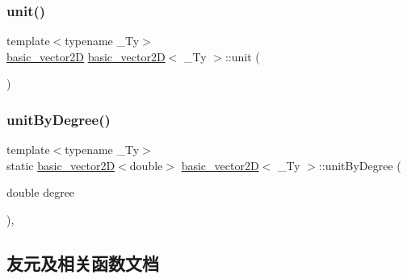 \mbox{\label{structbasic__vector2_d_aa4b24c577ef24c814370beebc22f3bb8}} 
\subsubsection{\texorpdfstring{unit()}{unit()}}
{\footnotesize\ttfamily template$<$typename \+\_\+\+Ty$>$ \\
\hyperlink{structbasic__vector2_d}{basic\+\_\+vector2D} \hyperlink{structbasic__vector2_d}{basic\+\_\+vector2D}$<$ \+\_\+\+Ty $>$\+::unit (\begin{DoxyParamCaption}{ }\end{DoxyParamCaption})\hspace{0.3cm}{\ttfamily [inline]}}

\mbox{\label{structbasic__vector2_d_aa31b5b9b9261d28ecd2626ba38b61278}} 
\subsubsection{\texorpdfstring{unit\+By\+Degree()}{unitByDegree()}}
{\footnotesize\ttfamily template$<$typename \+\_\+\+Ty$>$ \\
static \hyperlink{structbasic__vector2_d}{basic\+\_\+vector2D}$<$double$>$ \hyperlink{structbasic__vector2_d}{basic\+\_\+vector2D}$<$ \+\_\+\+Ty $>$\+::unit\+By\+Degree (\begin{DoxyParamCaption}\item[{double}]{degree }\end{DoxyParamCaption})\hspace{0.3cm}{\ttfamily [inline]}, {\ttfamily [static]}}



\subsection{友元及相关函数文档}
\mbox{\label{structbasic__vector2_d_adb9aa08ea9517ddbfd6d610e270a1a0e}} 
